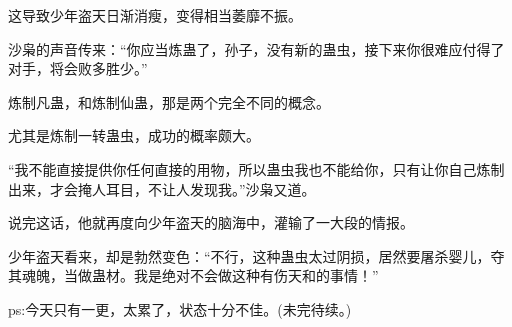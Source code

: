 \begin{this_body}
这导致少年盗天日渐消瘦，变得相当萎靡不振。

沙枭的声音传来：“你应当炼蛊了，孙子，没有新的蛊虫，接下来你很难应付得了对手，将会败多胜少。”

炼制凡蛊，和炼制仙蛊，那是两个完全不同的概念。

尤其是炼制一转蛊虫，成功的概率颇大。

“我不能直接提供你任何直接的用物，所以蛊虫我也不能给你，只有让你自己炼制出来，才会掩人耳目，不让人发现我。”沙枭又道。

说完这话，他就再度向少年盗天的脑海中，灌输了一大段的情报。

少年盗天看来，却是勃然变色：“不行，这种蛊虫太过阴损，居然要屠杀婴儿，夺其魂魄，当做蛊材。我是绝对不会做这种有伤天和的事情！”

ps:今天只有一更，太累了，状态十分不佳。(未完待续。)

\end{this_body}

